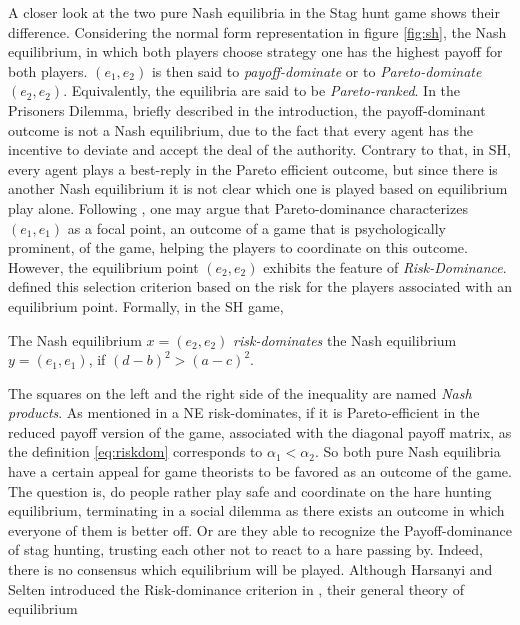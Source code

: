 \documentclass[11pt]{article}
\begin{document}
A closer look at the two pure Nash equilibria in the Stag hunt game 
shows their difference. Considering the normal form representation in figure 
\ref{fig:sh}, the Nash equilibrium, in which both players choose strategy one 
has the highest payoff
for both players. $(e_1,e_2)$ is then said to 
\textit{payoff-dominate} or to \textit{Pareto-dominate} 
$(e_2,e_2)$. Equivalently, the equilibria are said to be
\textit{Pareto-ranked}.
In the Prisoners Dilemma, briefly described in the introduction, 
the payoff-dominant outcome is not a 
Nash equilibrium, due to the fact that every agent has the incentive to 
deviate and accept the deal of the authority.
Contrary to that, in SH, every agent plays a best-reply 
in the Pareto efficient outcome, but since there is another Nash equilibrium 
it is not clear which one is played based on equilibrium play alone. 
Following \textcite[57]{schelling_strategy_1960}, one may argue that 
Pareto-dominance characterizes $(e_1,e_1)$ as a focal point, 
an outcome of a game that is psychologically prominent, of 
the game, helping the players to coordinate on this outcome.
However, the equilibrium point $(e_2,e_2)$ exhibits the feature 
of \textit{Risk-Dominance}. 
\textcite{harsanyi_general_1988} defined this selection criterion 
based on the
risk for the players associated with an equilibrium point. Formally, in the
SH game, 
\begin{mydef}
The Nash equilibrium $x=(e_2,e_2)$ \textit{risk-dominates} 
the Nash equilibrium $y=(e_1,e_1)$, if $(d-b)^2 > (a-c)^2$.
         \label{eq:riskdom}
 \end{mydef}
The squares on the left and the right side of the inequality are named
\textit{Nash products}.
As mentioned in \textcite{weibull_evolutionary_1997} a NE risk-dominates, 
if it is Pareto-efficient  in the reduced payoff version of the game, 
associated with the diagonal
payoff matrix, as the definition \eqref{eq:riskdom} 
corresponds to $\alpha_1 < \alpha_2$.
So both pure Nash equilibria have a certain appeal for game theorists to be
favored as an outcome of the game. The question is, do people rather play
safe and coordinate on the hare hunting equilibrium, terminating in a social
dilemma as there exists an outcome in which everyone of them is better off.
Or are they able to recognize the Payoff-dominance of stag hunting, 
trusting each other not to react to a hare passing by.
Indeed, there is no consensus which equilibrium will be played. 
Although Harsanyi and Selten introduced the Risk-dominance criterion in 
\textcite{harsanyi_general_1988}, their general theory of equilibrium 
\end{document}
